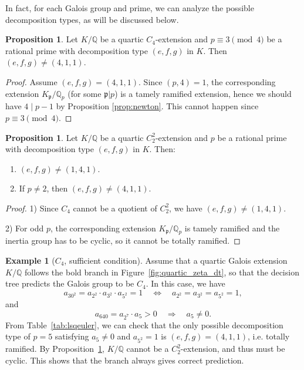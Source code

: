 \documentclass[letterpaper, 10pt]{article}
\newcommand{\bQ}{\mathbb{Q}}
\newcommand{\frp}{\mathfrak{p}}
\newcommand{\1}{\mathds{1}}	%
\theoremstyle{definition}
\newtheorem{proposition}[theorem]{Proposition}
\newtheorem{example}[theorem]{Example}
\theoremstyle{remark}
\begin{document}
In fact, for each Galois group and prime, we can analyze the possible decomposition types, as will be discussed below.

\begin{proposition}
    Let $K / \bQ$ be a quartic $C_4$-extension and $p \equiv 3 \pmod{4}$ be a rational prime with decomposition type $(e, f, g)$ in $K$.
    Then $(e, f, g) \ne (4, 1, 1)$.
\end{proposition}
\begin{proof}
    Assume $(e, f, g) = (4, 1, 1)$.
    Since $(p, 4) = 1$, the corresponding extension $K_\frp / \bQ_p$ (for some $\frp|p$) is a tamely ramified extension, hence we should have $4 \mid p - 1$ by Proposition \ref{prop:newton}.
    This cannot happen since $p \equiv 3 \pmod{4}$.
\end{proof}

\begin{proposition}
    \label{prop:C2C2ram}
    Let $K / \bQ$ be a quartic $C_2^2$-extension and $p$ be a rational prime with decomposition type $(e, f, g)$ in $K$. Then:
    \begin{enumerate}
        \item $(e, f, g) \ne (1, 4, 1)$.
        \item If $p \ne 2$, then $(e, f, g) \ne (4, 1, 1)$.
    \end{enumerate}
\end{proposition}
\begin{proof}
    1) Since $C_4$ cannot be a quotient of $C_2^2$, we have $(e, f, g) \ne (1, 4, 1)$.
    
    2) For odd $p$, the corresponding extension $K_\frp / \bQ_p$ is tamely ramified and the inertia group has to be cyclic, so it cannot be totally ramified.
\end{proof}

\begin{example}[$C_4$, sufficient condition]
    Assume that a quartic Galois extension \( K / \mathbb{Q} \) follows the bold branch in Figure~\ref{fig:quartic_zeta_dt}, so that the decision tree predicts the Galois group to be \( C_4 \).   In this case, we have
\[
a_{30^2} = a_{2^2} \cdot a_{3^2} \cdot a_{5^2} = 1 \quad \Leftrightarrow \quad a_{2^2} = a_{3^2} = a_{5^2} = 1,
\]
and
\[
a_{640} = a_{2^7} \cdot a_5 >  0 \quad \Rightarrow \quad a_5 \ne 0.
\]
 From Table~\ref{tab:lsqeuler}, we can check that the only possible decomposition type of $p = 5$ satisfying $a_{5} \ne 0$ and $a_{5^2} = 1$ is $(e, f, g) = (4, 1, 1)$, i.e. totally ramified.
By Proposition~\ref{prop:C2C2ram}, \( K / \mathbb{Q} \) cannot be a \( C_2^2\)-extension, and thus must be cyclic.  
    This shows that the branch always gives correct prediction.
\end{example}
\end{document}
